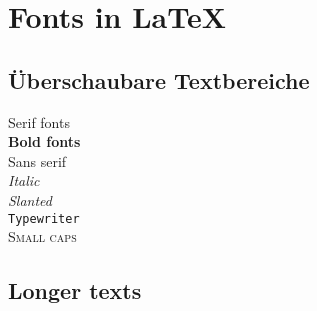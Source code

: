 \documentclass[10pt, a4paper]{article}
\begin{document}
\section{Fonts in \LaTeX}

\subsection{Überschaubare Textbereiche}

\textrm{Serif fonts} \\
\textbf{Bold fonts}\\
\textsf{Sans serif}\\
\textit{Italic}\\
\textsl{Slanted}\\
\texttt{Typewriter}\\
\textsc{Small caps}

\subsection{Longer texts}

{\ttfamily \blindtext}

\begingroup \sffamily \blindtext \endgroup

{\bfseries \blindtext}

{\itshape \blindtext}

{\slshape \blindtext}

{\scshape \blindtext}
\end{document}
